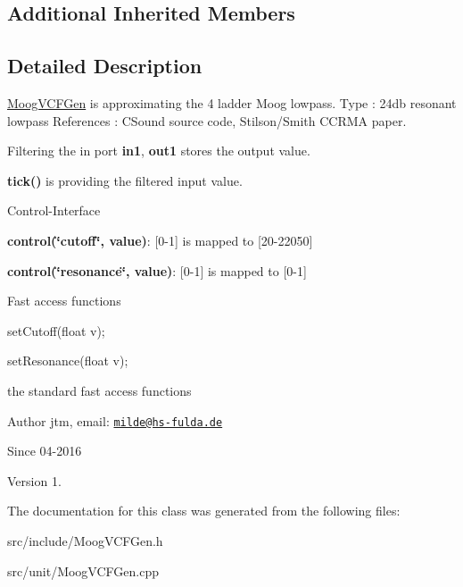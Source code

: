 \subsection*{Additional Inherited Members}


\subsection{Detailed Description}
\hyperlink{classunit_1_1MoogVCFGen}{Moog\-V\-C\-F\-Gen} is approximating the 4 ladder Moog lowpass. Type \-: 24db resonant lowpass References \-: C\-Sound source code, Stilson/\-Smith C\-C\-R\-M\-A paper.

Filtering the in port {\bfseries in1}, {\bfseries out1} stores the output value.


\begin{DoxyItemize}
\item {\bfseries tick()} is providing the filtered input value.
\end{DoxyItemize}

Control-\/\-Interface


\begin{DoxyItemize}
\item {\bfseries control(\char`\"{}cutoff\char`\"{}, value)}\-: \mbox{[}0-\/1\mbox{]} is mapped to \mbox{[}20-\/22050\mbox{]}
\item {\bfseries control(\char`\"{}resonance\char`\"{}, value)}\-: \mbox{[}0-\/1\mbox{]} is mapped to \mbox{[}0-\/1\mbox{]}
\end{DoxyItemize}

Fast access functions
\begin{DoxyItemize}
\item set\-Cutoff(float v);
\item set\-Resonance(float v);
\item the standard fast access functions
\end{DoxyItemize}

\begin{DoxyAuthor}{Author}
jtm, email\-:  \href{mailto:milde@hs-fulda.de}{\tt milde@hs-\/fulda.\-de} 
\end{DoxyAuthor}
\begin{DoxySince}{Since}
04-\/2016 
\end{DoxySince}
\begin{DoxyVersion}{Version}
1. 
\end{DoxyVersion}


The documentation for this class was generated from the following files\-:\begin{DoxyCompactItemize}
\item 
src/include/Moog\-V\-C\-F\-Gen.\-h\item 
src/unit/Moog\-V\-C\-F\-Gen.\-cpp\end{DoxyCompactItemize}
